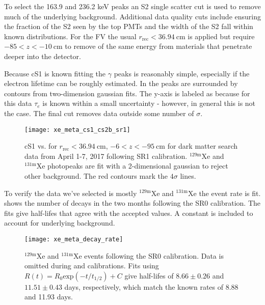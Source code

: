 To select the 163.9 and 236.2 keV peaks an S2 single scatter cut is used to remove much of the underlying background.  Additional data
quality
cuts include ensuring the fraction of the S2 seen by the top PMTs and the width of the S2 fall within known distributions.  For the FV
the usual $r_{\mathrm{rec}} < 36.94\ \mathrm{cm}$ is applied but require $-85 < z < -10\ \mathrm{cm}$ to remove \gammarays of the same
energy from materials that penetrate deeper into the detector.

Because cS1 is known fitting the $\gamma$ peaks is reasonably simple, especially if the electron lifetime can be roughly estimated.  In
 the peaks are surrounded by contours from two-dimension gaussian fits.  The
y-axis is labeled as \cstwob because for this data $\tau_e$ is known within a small uncertainty - however, in general this is not
the case.  The final cut removes data outside some number of $\sigma$.

\begin{figure}
\centering
\texttt{[image: xe\_meta\_cs1\_cs2b\_sr1]}
\caption{cS1 vs. \cstwob for $r_{\mathrm{rec}} < 36.94\ \mathrm{cm}$, $-6 < z < -95\ \mathrm{cm}$ for dark matter search data from April
1-7, 2017 following SR1 \ambe calibration.  $\mathrm{^{129m}Xe}$ and
$\mathrm{^{131m}Xe}$ photopeaks are fit with a 2-dimensional gaussian to reject other background.  The red contours mark
the $4\sigma$ lines.}
\label{fig:electron_lifetimes_measurement_gammas_cs1_cs2}
\end{figure}

To verify the data we've selected is mostly $\mathrm{^{129m}Xe}$ and $\mathrm{^{131m}Xe}$ the event rate is
fit.  shows the number of decays in the two months following the
SR0 \ambe calibration.  The fits give half-lifes that agree with the accepted values.  A constant is included to account for underlying
background.

\begin{figure}
\centering
\texttt{[image: xe\_meta\_decay\_rate]}
\caption{$\mathrm{^{129m}Xe}$ and $\mathrm{^{131m}Xe}$ events following the SR0 \ambe calibration.  Data is omitted during \metakr
and  calibrations.  Fits using $R(t) = R_0 \mathrm{exp}(-t/t_{1/2}) + C$ give half-lifes of $8.66 \pm 0.26$ and
$11.51 \pm 0.43$ days, respectively, which match the known rates of 8.88 and 11.93 days.}
\label{fig:electron_lifetimes_measurement_gammas_decay_rate}
\end{figure}

